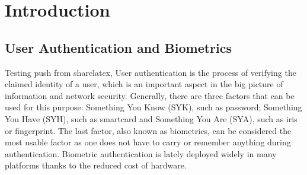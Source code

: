 
\chapter{Introduction}  %

\ifpdf
    \graphicspath{{Chapter1/Figs/Raster/}{Chapter1/Figs/PDF/}{Chapter1/Figs/}}
\else
    \graphicspath{{Chapter1/Figs/Vector/}{Chapter1/Figs/}}
\fi

\section{User Authentication and Biometrics}
\label{sec:biometricIntro}
Testing push from sharelatex, User authentication is the process of verifying the claimed identity of a user,
which is an important aspect in the big picture of information and network
security. Generally, there are three factors that can be used for this purpose:
Something You Know (SYK), such as password; Something You Have (SYH), such as
smartcard and Something You Are (SYA), such as iris or fingerprint. The last
factor, also known as biometrics, can be considered the most usable factor as
one does not have to carry or remember anything during authentication.
Biometric authentication is lately deployed widely in many platforms thanks to
the reduced cost of hardware.

